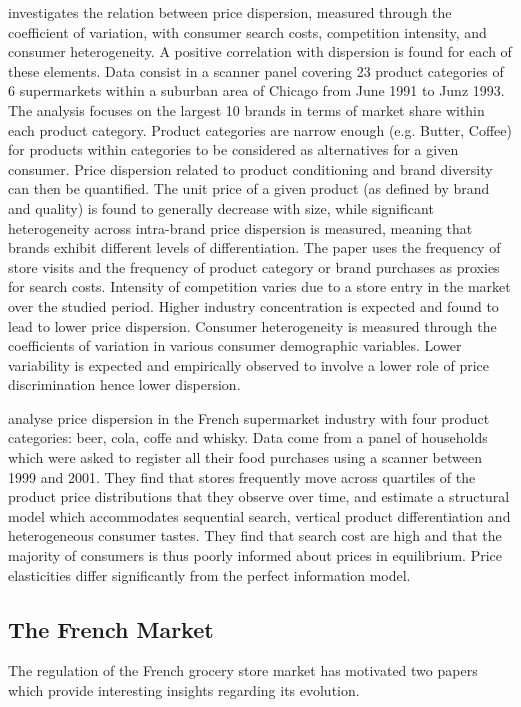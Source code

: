 \documentclass[english]{article}
\begin{document}
\cite{ZHA06} investigates the relation between price dispersion, measured through the coefficient of variation, with consumer search costs, competition intensity, and consumer heterogeneity. A positive correlation with dispersion is found for each of these elements. Data consist in a scanner panel covering 23 product categories of 6 supermarkets within a suburban area of Chicago from June 1991 to Junz 1993. The analysis focuses on the largest 10 brands in terms of market share within each product category. Product categories are narrow enough (e.g. Butter, Coffee) for products within categories to be considered as alternatives for a given consumer. Price dispersion related to product conditioning and brand diversity can then be quantified. The unit price of a given product (as defined by brand and quality) is found to generally decrease with size, while significant heterogeneity across intra-brand price dispersion is measured, meaning that brands exhibit different levels of differentiation. The paper uses the frequency of store visits and the frequency of product category or brand purchases as proxies for search costs. Intensity of competition varies due to a store entry in the market over the studied period. Higher industry concentration is expected and found to lead to lower price dispersion. Consumer heterogeneity is measured through the coefficients of variation in various consumer demographic variables. Lower variability is expected and empirically observed to involve a lower role of price discrimination hence lower dispersion.

\cite{PER15} analyse price dispersion in the French supermarket industry with four product categories: beer, cola, coffe and whisky. Data come from a panel of households which were asked to register all their food purchases using a scanner between 1999 and 2001. They find that stores frequently move across quartiles of the product price distributions that they observe over time, and estimate a structural model which accommodates sequential search, vertical product differentiation and heterogeneous consumer tastes. They find that search cost are high and that the majority of consumers is thus poorly informed about prices in equilibrium. Price elasticities differ significantly from the perfect information model.

\subsection{The French Market}

The regulation of the French grocery store market has motivated two papers which provide interesting insights regarding its evolution.
\end{document}

